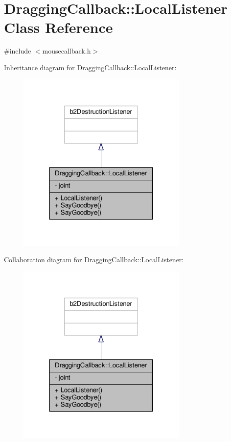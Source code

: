 \hypertarget{classDraggingCallback_1_1LocalListener}{}\section{Dragging\+Callback\+:\+:Local\+Listener Class Reference}
\label{classDraggingCallback_1_1LocalListener}


{\ttfamily \#include $<$mousecallback.\+h$>$}



Inheritance diagram for Dragging\+Callback\+:\+:Local\+Listener\+:
\nopagebreak
\begin{figure}[H]
\begin{center}
\leavevmode
\includegraphics[width=238pt]{classDraggingCallback_1_1LocalListener__inherit__graph}
\end{center}
\end{figure}


Collaboration diagram for Dragging\+Callback\+:\+:Local\+Listener\+:
\nopagebreak
\begin{figure}[H]
\begin{center}
\leavevmode
\includegraphics[width=238pt]{classDraggingCallback_1_1LocalListener__coll__graph}
\end{center}
\end{figure}
